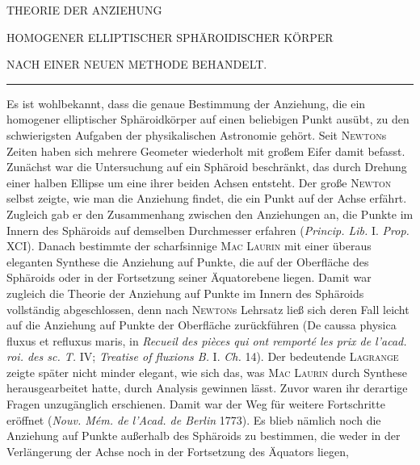 \begin{center}
THEORIE DER ANZIEHUNG\par
\bigskip
HOMOGENER ELLIPTISCHER SPHÄROIDISCHER KÖRPER\par
\bigskip
NACH EINER NEUEN METHODE BEHANDELT.\par
\medskip
\rule{.16\textwidth}{.3pt}
\end{center}
\par
Es ist wohlbekannt, dass die genaue Bestimmung der Anziehung, die ein homogener elliptischer Sphäroidkörper auf einen beliebigen Punkt ausübt, zu den schwierigsten Aufgaben der physikalischen Astronomie gehört. Seit \textsc{Newton}s Zeiten haben sich mehrere Geometer wiederholt mit großem Eifer damit befasst. Zunächst war die Untersuchung auf ein Sphäroid beschränkt, das durch Drehung einer halben Ellipse um eine ihrer beiden Achsen entsteht. Der große \textsc{Newton} selbst zeigte, wie man die Anziehung findet, die ein Punkt auf der Achse erfährt. Zugleich gab er den Zusammenhang zwischen den Anziehungen an, die Punkte im Innern des Sphäroids auf demselben Durchmesser erfahren (\textit{Princip. Lib.} I. \textit{Prop.} XCI). Danach bestimmte der scharfsinnige \textsc{Mac Laurin} mit einer überaus eleganten Synthese die Anziehung auf Punkte, die auf der Oberfläche des Sphäroids oder in der Fortsetzung seiner Äquatorebene liegen. Damit war zugleich die Theorie der Anziehung auf Punkte im Innern des Sphäroids vollständig abgeschlossen, denn nach \textsc{Newton}s Lehrsatz ließ sich deren Fall leicht auf die Anziehung auf Punkte der Oberfläche zurückführen (De caussa physica fluxus et refluxus maris, in \textit{Recueil des pièces qui ont remporté les prix de l’acad. roi. des sc. T.} IV; \textit{Treatise of fluxions B.} I. \textit{Ch.} 14). Der bedeutende \textsc{Lagrange} zeigte später nicht minder elegant, wie sich das, was \textsc{Mac Laurin} durch Synthese herausgearbeitet hatte, durch Analysis gewinnen lässt. Zuvor waren ihr derartige Fragen unzugänglich erschienen. Damit war der Weg für weitere Fortschritte eröffnet (\textit{Nouv. Mém. de l’Acad. de Berlin} 1773). Es blieb nämlich noch die Anziehung auf Punkte außerhalb des Sphäroids zu bestimmen, die weder in der Verlängerung der Achse noch in der Fortsetzung des Äquators liegen,
